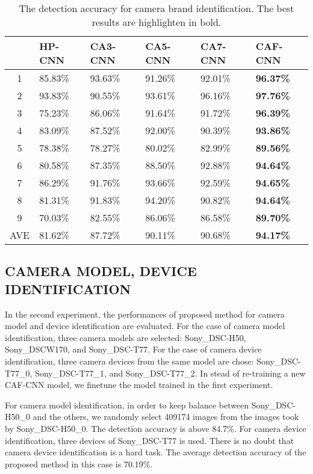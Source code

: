 \documentclass{article}
\begin{document}
 
\begin{table}[]
	\centering
	\caption{The detection accuracy for camera brand identification. The best results are highlighten in bold.}
	\label{my-label}
	\begin{tabular}{|c|p{1.1cm}|p{1.1cm}|p{1.1cm}|p{1.1cm}|p{1.1cm}|}
		\hline
		& HP-CNN & CA3-CNN & CA5-CNN & CA7-CNN & CAF-CNN \\ \hline
		1 & 85.83\% & 93.63\% & 91.26\% & 92.01\% & \textbf{96.37\%} \\ \hline
		2 & 93.83\% & 90.55\% & 93.61\% & 96.16\% & \textbf{97.76\%} \\ \hline
		3 & 75.23\% & 86.06\% & 91.64\% & 91.72\% & \textbf{96.39\%} \\ \hline
		4 & 83.09\% & 87.52\% & 92.00\% & 90.39\% & \textbf{93.86\%} \\ \hline
		5 & 78.38\% & 78.27\% & 80.02\% & 82.99\% & \textbf{89.56\%} \\ \hline
		6 & 80.58\% & 87.35\% & 88.50\% & 92.88\% & \textbf{94.64\%} \\ \hline
		7 & 86.29\% & 91.76\% & 93.66\% & 92.59\% & \textbf{94.65\%} \\ \hline
		8 & 81.31\% & 91.83\% & 94.20\% & 90.82\% & \textbf{94.64\%} \\ \hline
		9 & 70.03\% & 82.55\% & 86.06\% & 86.58\% & \textbf{89.70\%} \\ \hline
		AVE & 81.62\% & 87.72\% & 90.11\% & 90.68\% & \textbf{94.17\%} \\ \hline
	\end{tabular}
\end{table}

\subsection{CAMERA MODEL, DEVICE IDENTIFICATION}
\label{ssec:subhead}
In the second experiment, the performances of proposed method for camera model and device identification are evaluated. For the case of camera model identification, three camera models are selected: Sony\_DSC-H50, Sony\_DSC\-W170, and Sony\_DSC-T77. For the case of camera device identification, three camera devices from the same model are chose: Sony\_DSC-T77\_0, Sony\_DSC-T77\_1, and Sony\_DSC-T77\_2. In stead of re-training a new CAF-CNN model, we finetune the model trained in the first experiment.

For camera model identification, in order to keep balance between Sony\_DSC-H50\_0 and the others, we randomly select 409174 images from the images took by Sony\_DSC-H50\_0. The detection accuracy is above 84.7\%. For camera device identification, three devices of Sony\_DSC-T77 is used. There is no doubt that camera device identification is a hard task. The average detection accuracy of the proposed method in this case is 70.19\%.
\end{document}

